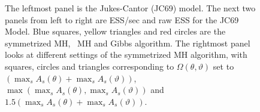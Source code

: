 \begin{figure}
\begin{minipage}[!hp]{0.24\linewidth}
\end{minipage}
  \caption{The leftmost panel is the Jukes-Cantor (JC69) model. The next two panels from left to right are ESS/sec and raw ESS for the JC69 Model. 
    Blue squares, yellow triangles and red circles are the symmetrized MH, \naive\ MH and Gibbs algorithm.
    The rightmost panel looks at different settings of the symmetrized MH algorithm, with squares, circles and triangles corresponding to 
$\Omega(\theta,\vartheta)$ set to $(\max_s A_s(\theta) + \max_s A_s(\vartheta))$, $\max(\max_s A_s(\theta), \max_s A_s(\vartheta))$ and  $1.5(\max_s A_s(\theta) + \max_s A_s(\vartheta))$.
     \label{fig:ESS_JC}
   }
 \end{figure}

